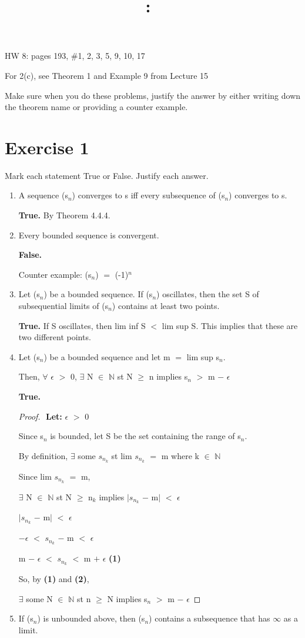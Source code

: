 \documentclass{article}
\title{
    \vspace{2in}
    \textmd{\textbf{\hmwkClass:\ \hmwkTitle}}\\
    \normalsize\vspace{0.1in}\small\vspace{0.1in}\large{\textit{\hmwkClassInstructor}}
    \vspace{3in}
}
\author{\hmwkAuthorName}
\date{}
\newcommand{\mt}[1]{\ensuremath{#1}}
\newcommand\bsc[2][\DefaultOpt]{%
  \def\DefaultOpt{#2}%
  \section[#1]{#2}%
}
\newcommand{\bgpf}{\begin{proof} $ $\newline}
\newcommand{\balist}{\begin{enumerate}[label=\alph*.]}
\newcommand{\elist}{\end{enumerate}}
\newcommand{\lt}[1]{\textbf{Let: } #1}
\newcommand{\bpth}[1]{\textbf{(#1)}}
\newcommand{\epf}{\end{proof}}
\newcommand{\dbs}[3]{\mt{#1_{#2_#3}}}
\newcommand{\bn}{\mt{\mathbb{N}} }       %
\newcommand{\ep}{\mt{\epsilon} }         %
\newcommand{\fa}{\mt{\forall} }          %
\newcommand{\mem}{\mt{\in} }
\newcommand{\exs}{\mt{\exists} }
\newcommand{\av}[1]{\mt{|}#1\mt{|}}  %
\newcommand{\prn}[1]{(#1)}
\newcommand{\ps}{\mt{+} }
\newcommand{\ms}{\mt{-} }
\newcommand{\ls}{\mt{<} }
\newcommand{\gr}{\mt{>} }
\newcommand{\gre}{\mt{\geq} }
\newcommand{\eql}{\mt{=} }
\newcommand{\uw}[2]{#1\mt{_{#2}}}
\newcommand{\uf}[2]{#1\mt{^{#2}}}
\newcommand{\infy}{\mt{\infty} }
\begin{document}
HW 8: pages 193, \#1, 2, 3, 5, 9, 10, 17

For 2(c), see Theorem 1 and Example 9 from Lecture 15

Make sure when you do these problems, justify the answer by either writing down the theorem name or providing a counter example.

\bsc{Exercise 1}{

Mark each statement True or False. Justify each answer.

\balist
\item A sequence \prn{\uw{s}{n}} converges to s iff every subsequence of (\uw{s}{n}) converges to s.
	
	\textbf{True.} By Theorem 4.4.4.
	
	
\item Every bounded sequence is convergent.
	
	\textbf{False.}
	
	Counter example: \prn{\uw{s}{n}} \eql \uf{(-1)}{n}
\item Let (\uw{s}{n}) be a bounded sequence. If \prn{\uw{s}{n}} oscillates, then the set S of subsequential limits of \prn{\uw{s}{n}} contains at least two points.

	\textbf{True.} If S oscillates, then lim inf S \ls lim sup S. This implies that these are two different points.
\item Let \prn{\uw{s}{n}} be a bounded sequence and let m \eql lim sup \uw{s}{n}.
	
	Then, \fa \ep \gr 0, \exs N \mem \bn st N \gre n implies \uw{s}{n} \gr m \ms \ep
	
	\textbf{True.}
	\bgpf
	\lt{\ep \gr 0}
	
	Since \uw{s}{n} is bounded, let S be the set containing the range of \uw{s}{n}.
	
	By definition, \exs some \dbs{s}{n}{k} st lim \dbs{s}{n}{k} \eql m where k \mem \bn 
	
	Since lim \dbs{s}{n}{k} \eql m,
	
	\exs N \mem \bn st N \gre \uw{n}{k} implies \av{\dbs{s}{n}{k} \ms m} \ls \ep
	
	\av{\dbs{s}{n}{k} \ms m} \ls \ep
	
	$-$\ep \ls \dbs{s}{n}{k} \ms m \ls \ep
	
	m \ms \ep \ls \dbs{s}{n}{k} \ls m \ps \ep \bpth{1}
	
	So, by \bpth{1} and \bpth{2},
	
	\exs some N \mem \bn st n \gre N implies \uw{s}{n} \gr m \ms \ep
	
	\epf
\item If \prn{\uw{s}{n}} is unbounded above, then \prn{\uw{s}{n}} contains a subsequence that has \infy as a limit.
\elist

}
\end{document}
